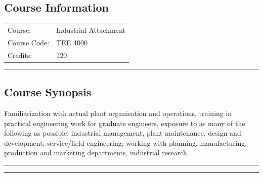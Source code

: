 
\subsection*{Course Information}
\vspace{0ex}%
\noindent\parbox{0.5\textwidth}{%
    \noindent\begin{tabular}{@{}ll}
                 \textsf{Course:}          & 	Industrial Attachment \\
                 \textsf{Course Code:}         & 	TEE 4000 \\
                 \textsf{Credits:}    & 	120
    \end{tabular}}
\vspace{2ex}\hrule\vspace{2ex}


\subsection*{Course Synopsis}
Familiarization with actual plant organisation and operations, training in practical engineering work for graduate engineers, exposure to as many of the following as possible; industrial management, plant maintenance, design and development, service/field engineering; working with planning, manufacturing, production and marketing departments, industrial research.
\vspace{2ex}\hrule
\vspace{2ex}\hrule\vspace{2ex}